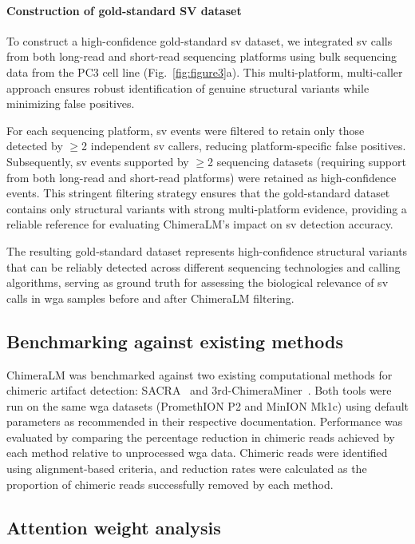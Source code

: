 \documentclass[pdflatex,sn-nature]{sn-jnl}%
\theoremstyle{thmstyleone}%
\theoremstyle{thmstyletwo}%
\theoremstyle{thmstylethree}%
\begin{document}
\paragraph{Construction of gold-standard SV dataset}
To construct a high-confidence gold-standard \gls{sv} dataset, we integrated \gls{sv} calls from both long-read and short-read sequencing platforms using bulk sequencing data from the PC3 cell line (Fig.~\ref{fig:figure3}a).
This multi-platform, multi-caller approach ensures robust identification of genuine structural variants while minimizing false positives.

For each sequencing platform, \gls{sv} events were filtered to retain only those detected by $\geq$2 independent \gls{sv} callers, reducing platform-specific false positives.
Subsequently, \gls{sv} events supported by $\geq$2 sequencing datasets (requiring support from both long-read and short-read platforms) were retained as high-confidence events.
This stringent filtering strategy ensures that the gold-standard dataset contains only structural variants with strong multi-platform evidence, providing a reliable reference for evaluating ChimeraLM's impact on \gls{sv} detection accuracy.

The resulting gold-standard dataset represents high-confidence structural variants that can be reliably detected across different sequencing technologies and calling algorithms, serving as ground truth for assessing the biological relevance of \gls{sv} calls in \gls{wga} samples before and after ChimeraLM filtering.

\subsection*{Benchmarking against existing methods}

ChimeraLM was benchmarked against two existing computational methods for chimeric artifact detection: SACRA~\cite{kiguchi2021long} and 3rd-ChimeraMiner~\cite{lu2023exploration}.
Both tools were run on the same \gls{wga} datasets (PromethION P2 and MinION Mk1c) using default parameters as recommended in their respective documentation.
Performance was evaluated by comparing the percentage reduction in chimeric reads achieved by each method relative to unprocessed \gls{wga} data.
Chimeric reads were identified using alignment-based criteria, and reduction rates were calculated as the proportion of chimeric reads successfully removed by each method.

\subsection*{Attention weight analysis}
\end{document}
